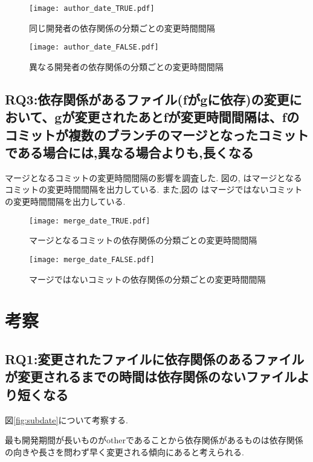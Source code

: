\documentclass[submit,ses,noauthor]{ipsj} %
\begin{document}
\begin{figure}
\centering
\texttt{[image: author\_date\_TRUE.pdf]}
\caption{同じ開発者の依存関係の分類ごとの変更時間間隔}
\label{fig:author_true_subdate} 
\end{figure}

\begin{figure}
\centering
\texttt{[image: author\_date\_FALSE.pdf]}
\caption{異なる開発者の依存関係の分類ごとの変更時間間隔}
\label{fig:author_false_subdate} 
\end{figure}


\subsection{RQ3:依存関係があるファイル(fがgに依存)の変更において、gが変更されたあとfが変更時間間隔は、fのコミットが複数のブランチのマージとなったコミットである場合には,異なる場合よりも,長くなる}
マージとなるコミットの変更時間間隔の影響を調査した.
図の,\label{fig:merge_true_subdate} はマージとなるコミットの変更時間間隔を出力している.
また,図の\label{fig:merge_false_subdate} はマージではないコミットの変更時間間隔を出力している.

\begin{figure}
\centering
\texttt{[image: merge\_date\_TRUE.pdf]}
\caption{マージとなるコミットの依存関係の分類ごとの変更時間間隔}
\label{fig:merge_true_subdate} 
\end{figure}

\begin{figure}
\centering
\texttt{[image: merge\_date\_FALSE.pdf]}
\caption{マージではないコミットの依存関係の分類ごとの変更時間間隔}
\label{fig:merge_false_subdate} 
\end{figure}


\section{考察}\label{考察}

\subsection{RQ1:変更されたファイルに依存関係のあるファイルが変更されるまでの時間は依存関係のないファイルより短くなる}
図\ref{fig:subdate}について考察する.

最も開発期間が長いものがotherであることから依存関係があるものは依存関係の向きや長さを問わず早く変更される傾向にあると考えられる.
\end{document}
